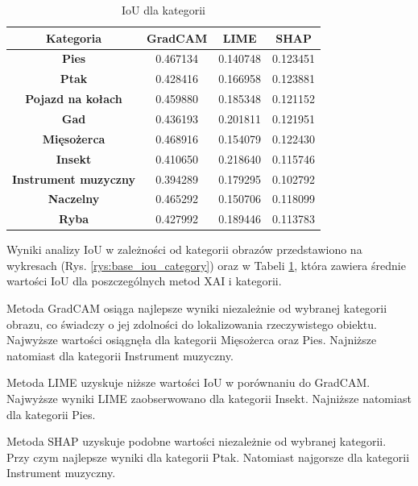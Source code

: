 \begin{table}[h]
	\centering
	\begin{tabular}{|c|c|c|c|}
		\hline
		\textbf{Kategoria}           & \textbf{GradCAM} & \textbf{LIME} & \textbf{SHAP} \\
		\hline
		\textbf{Pies}                & 0.467134         & 0.140748      & 0.123451      \\
		\hline
		\textbf{Ptak}                & 0.428416         & 0.166958      & 0.123881      \\
		\hline
		\textbf{Pojazd na kołach}    & 0.459880         & 0.185348      & 0.121152      \\
		\hline
		\textbf{Gad}                 & 0.436193         & 0.201811      & 0.121951      \\
		\hline
		\textbf{Mięsożerca}          & 0.468916         & 0.154079      & 0.122430      \\
		\hline
		\textbf{Insekt}              & 0.410650         & 0.218640      & 0.115746      \\
		\hline
		\textbf{Instrument muzyczny} & 0.394289         & 0.179295      & 0.102792      \\
		\hline
		\textbf{Naczelny}            & 0.465292         & 0.150706      & 0.118099      \\
		\hline
		\textbf{Ryba}                & 0.427992         & 0.189446      & 0.113783      \\
		\hline
	\end{tabular}
	\caption{IoU dla kategorii}
	\label{tab:base_iou_category}
\end{table}

Wyniki analizy IoU w zależności od kategorii obrazów przedstawiono na wykresach (Rys. \ref{rys:base_iou_category}) oraz w Tabeli \ref{tab:base_iou_category}, która zawiera średnie wartości IoU dla poszczególnych metod XAI i kategorii.

Metoda GradCAM osiąga najlepsze wyniki niezależnie od wybranej kategorii obrazu, co świadczy o jej zdolności do lokalizowania rzeczywistego obiektu.
Najwyższe wartości osiągnęła dla kategorii Mięsożerca oraz Pies.
Najniższe natomiast dla kategorii Instrument muzyczny.

Metoda LIME uzyskuje niższe wartości IoU w porównaniu do GradCAM.
Najwyższe wyniki LIME zaobserwowano dla kategorii Insekt.
Najniższe natomiast dla kategorii Pies.

Metoda SHAP uzyskuje podobne wartości niezależnie od wybranej kategorii.
Przy czym najlepsze wyniki dla kategorii Ptak.
Natomiast najgorsze dla kategorii Instrument muzyczny.

